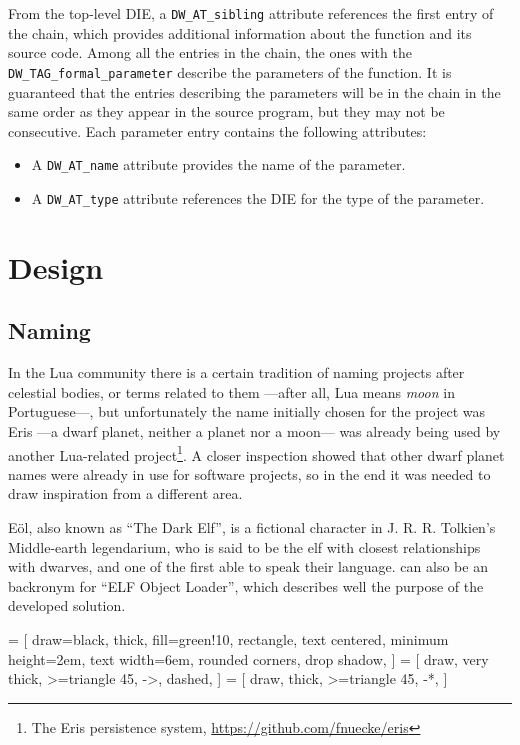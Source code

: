 From the top-level DIE, a \verb|DW_AT_sibling| attribute references the first
entry of the chain, which provides additional information about the function
and its source code. Among all the entries in the chain, the ones with the
\verb|DW_TAG_formal_parameter| describe the parameters of the function. It is
guaranteed that the entries describing the parameters will be in the chain in
the same order as they appear in the source program, but they may not be
consecutive. Each parameter entry contains the following attributes:

\begin{itemize}
  \item A \verb|DW_AT_name| attribute provides the name of the parameter.
  \item A \verb|DW_AT_type| attribute references the DIE for the type of
    the parameter.
\end{itemize}



\section{Design}


\subsection{Naming}

In the Lua community there is a certain tradition of naming projects after
celestial bodies, or terms related to them —after all, Lua means \emph{moon}
in Portuguese—, but unfortunately the name initially chosen for the project
was Eris —a dwarf planet, neither a planet nor a moon— was already being used
by another Lua-related project\footnote{The Eris persistence system,
\url{https://github.com/fnuecke/eris}}. A closer inspection showed that other
dwarf planet names were already in use for software projects, so in the end
it was needed to draw inspiration from a different area.

Eöl, also known as “The Dark Elf”, is a fictional character in
J. R. R. Tolkien's Middle-earth legendarium, who is said to be the elf with
closest relationships with dwarves, and one of the first able to speak their
language.  \Eol* can also be an \gls{backronym} for “ELF Object Loader”,
which describes well the purpose of the developed solution.

 = [
  draw=black,
  thick,
  fill=green!10,
  rectangle,
  text centered,
  minimum height=2em,
  text width=6em,
  rounded corners,
  drop shadow,
]
 = [
  draw,
  very thick,
  >=triangle 45,
  ->,
  dashed,
]
 = [
  draw,
  thick,
  >=triangle 45,
  -*,
]

